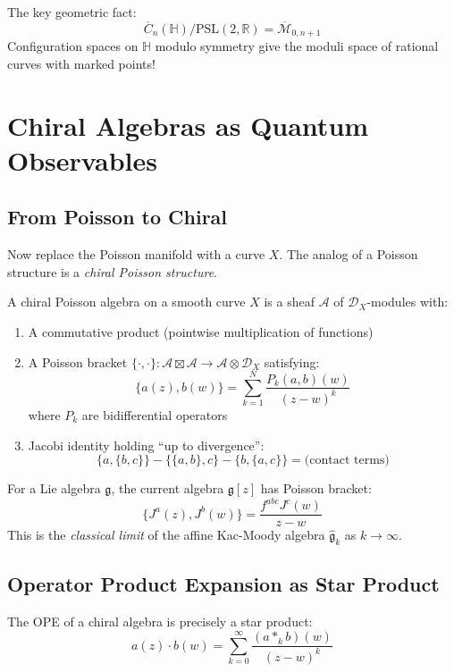The key geometric fact:
$$\overline{C}_n(\mathbb{H})/\text{PSL}(2,\mathbb{R}) = \overline{\mathcal{M}}_{0,n+1}$$
Configuration spaces on $\mathbb{H}$ modulo symmetry give the moduli space of rational curves with marked points!

\section{Chiral Algebras as Quantum Observables}

\subsection{From Poisson to Chiral}

Now replace the Poisson manifold with a curve $X$. The analog of a Poisson structure is a \emph{chiral Poisson structure}.

\begin{definition}
A chiral Poisson algebra on a smooth curve $X$ is a sheaf $\mathcal{A}$ of $\mathcal{D}_X$-modules with:
\begin{enumerate}
\item A commutative product (pointwise multiplication of functions)
\item A Poisson bracket $\{\cdot, \cdot\}: \mathcal{A} \boxtimes \mathcal{A} \to \mathcal{A} \otimes \mathcal{D}_X$ satisfying:
$$\{a(z), b(w)\} = \sum_{k=1}^N \frac{P_k(a,b)(w)}{(z-w)^k}$$
where $P_k$ are bidifferential operators
\item Jacobi identity holding ``up to divergence'':
$$\{a, \{b, c\}\} - \{\{a, b\}, c\} - \{b, \{a, c\}\} = \text{(contact terms)}$$
\end{enumerate}
\end{definition}

\begin{example}
For a Lie algebra $\mathfrak{g}$, the current algebra $\mathfrak{g}[z]$ has Poisson bracket:
$$\{J^a(z), J^b(w)\} = \frac{f^{abc} J^c(w)}{z-w}$$
This is the \emph{classical limit} of the affine Kac-Moody algebra $\widehat{\mathfrak{g}}_k$ as $k \to \infty$.
\end{example}

\subsection{Operator Product Expansion as Star Product}

The OPE of a chiral algebra is precisely a star product:
$$a(z) \cdot b(w) = \sum_{k=0}^\infty \frac{(a *_k b)(w)}{(z-w)^k}$$


